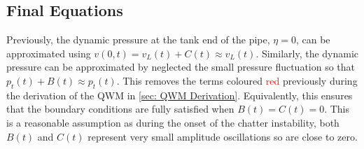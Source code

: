 

%

\subsection{Final Equations}


Previously, the dynamic pressure at the tank end of the pipe, $\eta = 0$, can be approximated using $v(0,t) = v_L(t) + C(t) \approx v_L(t)$. Similarly, the dynamic pressure can be approximated by neglected the small pressure fluctuation so that $p_t(t) + B(t) \approx p_t(t)$. This removes the terms coloured \textcolor{Red}{red} previously during the derivation of the QWM in \cref{sec: QWM Derivation}. Equivalently, this ensures that the boundary conditions are fully satisfied when $B(t) = C(t) = 0$. This is a reasonable assumption as during the onset of the chatter instability, both $B(t)$ and $C(t)$ represent very small amplitude oscillations so are close to zero.

